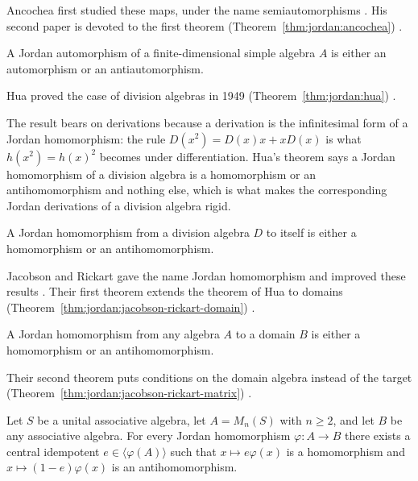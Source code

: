 Ancochea first studied these maps, under the name semiautomorphisms
\cite[p.~211]{BresarZelmanov2025}. His second paper is devoted to the first theorem (Theorem~\ref{thm:jordan:ancochea})
\cite[p.~211]{BresarZelmanov2025}.\begin{theorem}\label{thm:jordan:ancochea}
A Jordan automorphism of a finite-dimensional simple algebra $A$ is either an automorphism or an
antiautomorphism.
\end{theorem}

Hua proved the case of division algebras in 1949 (Theorem~\ref{thm:jordan:hua}) \cite[p.~211]{BresarZelmanov2025}.

The result bears on derivations because a derivation is the infinitesimal form
of a Jordan homomorphism: the rule $D(x^2)=D(x)x+xD(x)$ is what
$h(x^2)=h(x)^2$ becomes under differentiation. Hua's theorem says a Jordan
homomorphism of a division algebra is a homomorphism or an antihomomorphism and
nothing else, which is what makes the corresponding Jordan derivations of a
division algebra rigid.

\begin{theorem}\label{thm:jordan:hua}
A Jordan homomorphism from a division algebra $D$ to itself is either a homomorphism or an
antihomomorphism.
\end{theorem}

Jacobson and Rickart gave the name Jordan homomorphism and improved these results
\cite[p.~211]{BresarZelmanov2025}. Their first theorem extends the theorem of Hua to domains (Theorem~\ref{thm:jordan:jacobson-rickart-domain})
\cite[p.~211]{BresarZelmanov2025}.\begin{theorem}\label{thm:jordan:jacobson-rickart-domain}
A Jordan homomorphism from any algebra $A$ to a domain $B$ is either a homomorphism or an
antihomomorphism.
\end{theorem}

Their second theorem puts conditions on the domain algebra instead of the target (Theorem~\ref{thm:jordan:jacobson-rickart-matrix})
\cite[p.~211]{BresarZelmanov2025}.\begin{theorem}\label{thm:jordan:jacobson-rickart-matrix}
Let $S$ be a unital associative algebra, let $A=M_{n}(S)$ with $n\geq2$, and let $B$ be any
associative algebra. For every Jordan homomorphism $\varphi\colon A\to B$ there exists a central
idempotent $e\in\langle\varphi(A)\rangle$ such that $x\mapsto e\varphi(x)$ is a homomorphism and
$x\mapsto(1-e)\varphi(x)$ is an antihomomorphism.
\end{theorem}

